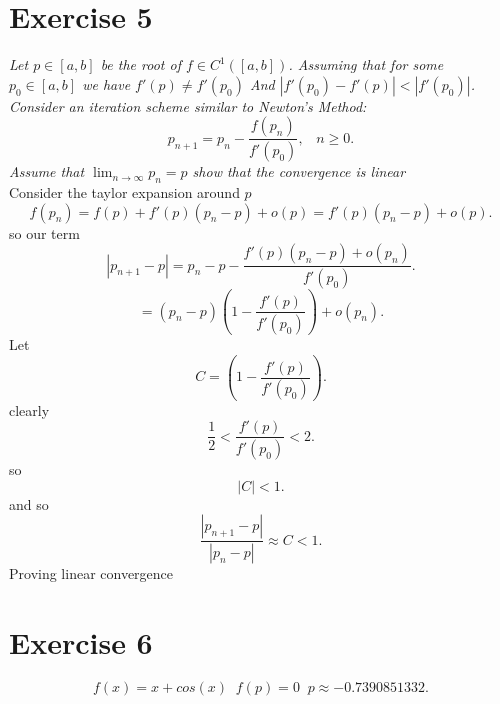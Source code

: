 \documentclass{amsart}
\begin{document}
    \section{Exercise 5}
    \emph{Let $p \in [a,b]$ be the root of $f \in C^{1}([a,b])$. Assuming that for some $p_0 \in [a,b]$ we have $f'(p) \ne f'(p_0)$ 
       And $|f'(p_0) - f'(p)| < |f'(p_0)|$. Consider an iteration scheme similar to Newton's Method:
       \[
           p_{n+1} = p_n - \frac{f(p_n)}{f'(p_0)}, \;\;\; n \ge 0
       .\] 
       Assume that $\lim_{n\to \infty}p_n = p$ show that the convergence is linear
   }\\
   Consider the taylor expansion around $p$ 
   \[
   f(p_n) = f(p) + f'(p)(p_n-p) + o(p) = f'(p)(p_n-p) + o(p)
   .\] 
   so our term
   \[
       |p_{n+1} - p| = p_n - p - \frac{f'(p)(p_n-p) + o(p_n)}{f'(p_0)} 
   .\] 
   \[
    = (p_n-p)(1-\frac{f'(p)}{f'(p_0)}) + o(p_n)
   .\] 
   Let
    \[
   C = (1-\frac{f'(p)}{f'(p_0)}) 
   .\] 
   clearly
   \[
       \frac{1}{2} < \frac{f'(p)}{f'(p_0)} < 2
   .\] 
   so
   \[
       |C| < 1
   .\] 
   and so
   \[
       \frac{|p_{n+1}-p|}{|p_n-p|} \approx C < 1
   .\] 
   Proving linear convergence

   \section{Exercise 6}
   \[
   f(x) = x + cos(x) \;\; f(p) = 0 \;\; p \approx -0.7390851332
   .\] 
\end{document}
